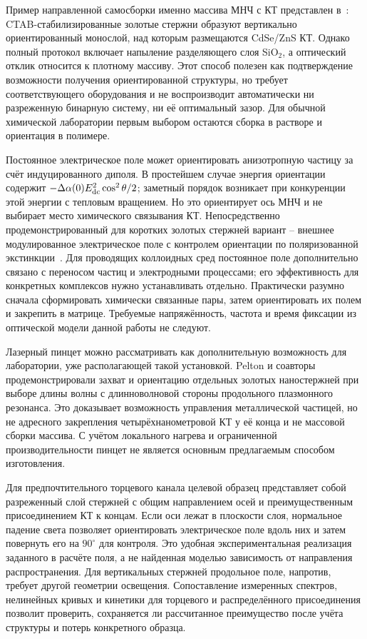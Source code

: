 Пример направленной самосборки именно массива МНЧ с КТ представлен
в~\cite{peng2014}: CTAB-стабилизированные золотые стержни образуют
вертикально ориентированный монослой, над которым размещаются
CdSe/ZnS КТ. Однако полный протокол включает напыление разделяющего
слоя SiO$_2$, а оптический отклик относится к плотному массиву.
Этот способ полезен как подтверждение возможности получения
ориентированной структуры, но требует соответствующего оборудования
и не воспроизводит автоматически ни разреженную бинарную систему,
ни её оптимальный зазор. Для обычной химической лаборатории
первым выбором остаются сборка в растворе и ориентация в полимере.

Постоянное электрическое поле может ориентировать анизотропную частицу
за счёт индуцированного диполя. В простейшем случае энергия ориентации
содержит $-\Delta\alpha(0)E_{\rm dc}^2\cos^2\theta/2$; заметный порядок
возникает при конкуренции этой энергии с тепловым вращением.
Но это ориентирует ось МНЧ и не выбирает место химического связывания КТ.
Непосредственно продемонстрированный для коротких золотых стержней
вариант -- внешнее модулированное электрическое поле с контролем
ориентации по поляризованной экстинкции~\cite{zijlstra2012}.
Для проводящих коллоидных сред постоянное поле дополнительно связано
с переносом частиц и электродными процессами; его эффективность
для конкретных комплексов нужно устанавливать отдельно. Практически
разумно сначала сформировать химически связанные пары, затем
ориентировать их полем и закрепить в матрице. Требуемые напряжённость,
частота и время фиксации из оптической модели данной работы не следуют.

Лазерный пинцет можно рассматривать как дополнительную возможность
для лаборатории, уже располагающей такой установкой. Pelton
и соавторы~\cite{pelton2006} продемонстрировали захват и ориентацию
отдельных золотых наностержней при выборе длины волны с длинноволновой
стороны продольного плазмонного резонанса. Это доказывает возможность
управления металлической частицей, но не адресного закрепления
четырёхнанометровой КТ у её конца и не массовой сборки массива.
С учётом локального нагрева и ограниченной производительности
пинцет не является основным предлагаемым способом изготовления.

Для предпочтительного торцевого канала целевой образец представляет
собой разреженный слой стержней с общим направлением осей и
преимущественным присоединением КТ к концам. Если оси лежат в плоскости
слоя, нормальное падение света позволяет ориентировать электрическое
поле вдоль них и затем повернуть его на $90^\circ$ для контроля.
Это удобная экспериментальная реализация заданного в расчёте поля,
а не найденная моделью зависимость от направления распространения.
Для вертикальных стержней продольное поле, напротив, требует другой
геометрии освещения. Сопоставление измеренных спектров, нелинейных
кривых и кинетики для торцевого и распределённого присоединения
позволит проверить, сохраняется ли рассчитанное преимущество после
учёта структуры и потерь конкретного образца.
